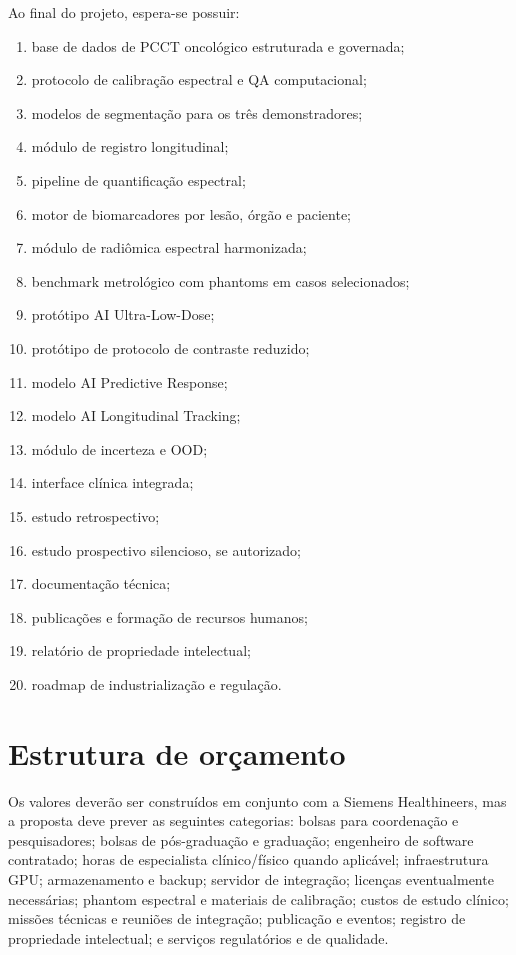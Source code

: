 \documentclass[11pt,a4paper]{article}
\begin{document}
Ao final do projeto, espera-se possuir:

\begin{enumerate}
\item base de dados de PCCT oncológico estruturada e governada;
\item protocolo de calibração espectral e QA computacional;
\item modelos de segmentação para os três demonstradores;
\item módulo de registro longitudinal;
\item pipeline de quantificação espectral;
\item motor de biomarcadores por lesão, órgão e paciente;
\item módulo de radiômica espectral harmonizada;
\item benchmark metrológico com phantoms em casos selecionados;
\item protótipo AI Ultra-Low-Dose;
\item protótipo de protocolo de contraste reduzido;
\item modelo AI Predictive Response;
\item modelo AI Longitudinal Tracking;
\item módulo de incerteza e OOD;
\item interface clínica integrada;
\item estudo retrospectivo;
\item estudo prospectivo silencioso, se autorizado;
\item documentação técnica;
\item publicações e formação de recursos humanos;
\item relatório de propriedade intelectual;
\item roadmap de industrialização e regulação.
\end{enumerate}

\section{Estrutura de orçamento}

Os valores deverão ser construídos em conjunto com a Siemens Healthineers, mas a proposta deve prever as seguintes categorias: bolsas para coordenação e pesquisadores; bolsas de pós-graduação e graduação; engenheiro de software contratado; horas de especialista clínico/físico quando aplicável; infraestrutura GPU; armazenamento e backup; servidor de integração; licenças eventualmente necessárias; phantom espectral e materiais de calibração; custos de estudo clínico; missões técnicas e reuniões de integração; publicação e eventos; registro de propriedade intelectual; e serviços regulatórios e de qualidade.
\end{document}
